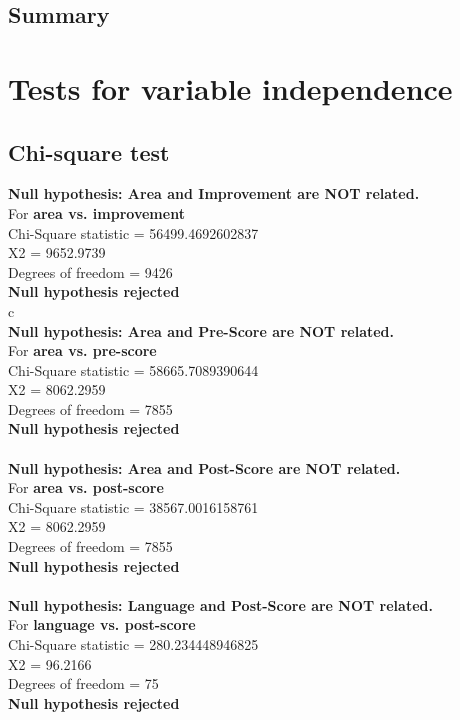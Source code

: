 \documentclass[10pt]{article}
\begin{document}
\subsection{Summary}
\newpage
\section{Tests for variable independence}
\subsection{Chi-square test}
\textbf{Null hypothesis: Area and Improvement are NOT related.} \\
 For \textbf{area vs. improvement}\\
 Chi-Square statistic = 56499.4692602837\\
 X2 = 9652.9739\\
 Degrees of freedom = 9426\\
 \textbf{Null hypothesis rejected}\\c
\\
\textbf{Null hypothesis: Area and Pre-Score are NOT related.}\\
 For \textbf{area vs. pre-score}\\
 Chi-Square statistic = 58665.7089390644\\
 X2 = 8062.2959\\
 Degrees of freedom = 7855\\
 \textbf{Null hypothesis rejected}\\
\\
\textbf{Null hypothesis: Area and Post-Score are NOT related.}\\
 For \textbf{area vs. post-score}\\
 Chi-Square statistic = 38567.0016158761\\
 X2 = 8062.2959\\
 Degrees of freedom = 7855\\
 \textbf{Null hypothesis rejected}\\
\\
\textbf{Null hypothesis: Language and Post-Score are NOT related.}\\
 For \textbf{language vs. post-score}\\
 Chi-Square statistic = 280.234448946825\\
 X2 = 96.2166\\
 Degrees of freedom = 75\\
 \textbf{Null hypothesis rejected}\\
\\
\end{document}
